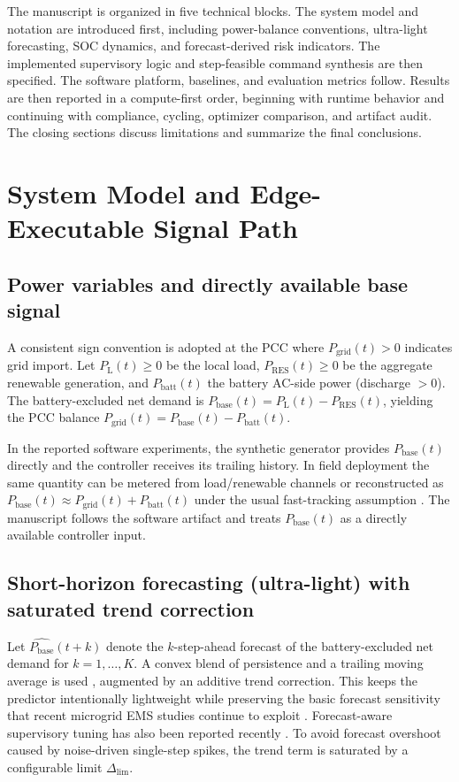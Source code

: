 \documentclass[preprint,12pt]{elsarticle}
\newcommand{\Pbatt}{P_{\mathrm{batt}}}
\newcommand{\Pgrid}{P_{\mathrm{grid}}}
\newcommand{\Pbase}{P_{\mathrm{base}}}
\newcommand{\Pload}{P_{\mathrm{L}}}
\newcommand{\Pres}{P_{\mathrm{RES}}}
\newcommand{\Dlim}{\Delta_{\lim}}
\begin{document}
The manuscript is organized in five technical blocks. The system model and notation are introduced first, including power-balance conventions, ultra-light forecasting, SOC dynamics, and forecast-derived risk indicators. The implemented supervisory logic and step-feasible command synthesis are then specified. The software platform, baselines, and evaluation metrics follow. Results are then reported in a compute-first order, beginning with runtime behavior and continuing with compliance, cycling, optimizer comparison, and artifact audit. The closing sections discuss limitations and summarize the final conclusions.

\section{System Model and Edge-Executable Signal Path} \label{sec:system_model}
\subsection{Power variables and directly available base signal}
A consistent sign convention is adopted at the PCC where $\Pgrid(t)>0$ indicates grid import. Let $\Pload(t)\ge 0$ be the local load, $\Pres(t)\ge 0$ be the aggregate renewable generation, and $\Pbatt(t)$ the battery AC-side power (discharge $>0$). The battery-excluded net demand is $\Pbase(t)=\Pload(t)-\Pres(t)$, yielding the PCC balance $\Pgrid(t)=\Pbase(t)-\Pbatt(t)$.

In the reported software experiments, the synthetic generator provides $\Pbase(t)$ directly and the controller receives its trailing history. In field deployment the same quantity can be metered from load/renewable channels or reconstructed as $\Pbase(t)\approx \Pgrid(t)+\Pbatt(t)$ under the usual fast-tracking assumption \cite{guerrero2010hierarchical,rocabert2012control}. The manuscript follows the software artifact and treats $\Pbase(t)$ as a directly available controller input.

\subsection{Short-horizon forecasting (ultra-light) with saturated trend correction}
Let $\widehat{\Pbase}(t+k)$ denote the $k$-step-ahead forecast of the battery-excluded net demand for $k=1,\dots,K$.
A convex blend of persistence and a trailing moving average is used \cite{dutta2017load}, augmented by an additive trend correction. This keeps the predictor intentionally lightweight while preserving the basic forecast sensitivity that recent microgrid EMS studies continue to exploit \cite{benamara2025jer}. Forecast-aware supervisory tuning has also been reported recently \cite{brown2026bayesian}.
To avoid forecast overshoot caused by noise-driven single-step spikes, the trend term is saturated by a configurable limit $\Dlim$.
\end{document}
